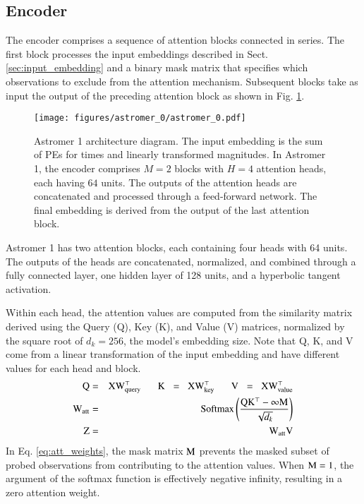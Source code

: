 \subsection{Encoder}
The encoder comprises a sequence of attention blocks connected in series. The first block processes the input embeddings described in Sect. \ref{sec:input_embedding} and a binary mask matrix that specifies which observations to exclude from the attention mechanism. Subsequent blocks take as input the output of the preceding attention block as shown in Fig. \ref{fig:astromer_0}.
\begin{figure}[!ht]
    \centering
    \texttt{[image: figures/astromer\_0/astromer\_0.pdf]}
    \caption{Astromer 1 architecture diagram. The input embedding is the sum of PEs for times and linearly transformed magnitudes. In Astromer 1, the encoder comprises $M=2$ blocks with $H=4$ attention heads, each having $64$ units. The outputs of the attention heads are concatenated and processed through a feed-forward network. The final embedding is derived from the output of the last attention block.}
    \label{fig:astromer_0}
\end{figure}

Astromer 1 has two attention blocks, each containing four heads with 64 units. The outputs of the heads are concatenated, normalized, and combined through a fully connected layer, one hidden layer of 128 units, and a hyperbolic tangent activation. 

Within each head, the attention values are computed from the similarity matrix derived using the Query (Q), Key (K), and Value (V) matrices, normalized by the square root of $d_k=256$, the model’s embedding size. Note that Q, K, and V come from a linear transformation of the input embedding and have different values for each head and block.
\begin{eqnarray}\label{eq:att_weights}
    \label{eq:mask_selfatt}
    \rm{Q}&=& \rm{X}\rm{W}_{query}^{\top}\hspace{6mm} \nonumber
    \rm{K} \hspace{2mm}=\hspace{2mm} 
    XW_{key}^{\top}\hspace{6mm}\rm{V} \hspace{2mm}=\hspace{2mm} \rm{X}\rm{W}_{value}^{\top}\\
    \rm{W}_{att} &=& \text{Softmax} \left ( \frac{\rm{Q}\rm{K}^{\top} -\infty\text{M}}{\sqrt{d_{k}}}\right )\\
    \rm{Z} &=& \rm{W}_{att}\rm{V}\nonumber
\end{eqnarray}
In Eq. \ref{eq:att_weights}, the mask matrix $\rm{M}$ prevents the masked subset of probed observations from contributing to the attention values. When $\rm{M}=1$, the argument of the softmax function is effectively negative infinity, resulting in a zero attention weight.

